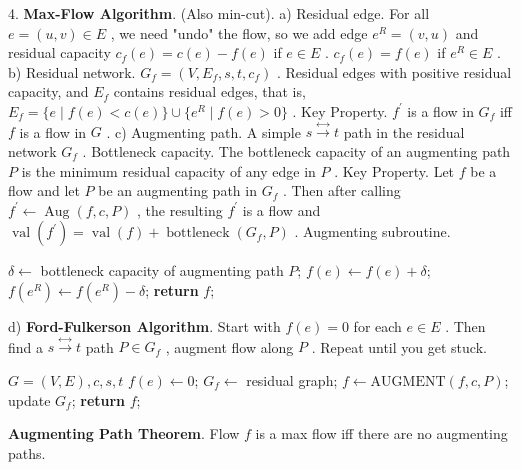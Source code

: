 \documentclass[10pt,a4paper]{article}
\begin{document}
4. \textbf{Max-Flow Algorithm}. (Also min-cut).
a) Residual edge. For all \(e = (u,v)\in E\) , we need "undo" the flow, so we add edge \(e^{R} = (v,u)\) and residual capacity \(c_{f}(e) = c(e) - f(e)\) if \(e\in E\) . \(c_{f}(e) = f(e)\) if \(e^{R}\in E\) .
b) Residual network. \(G_{f} = (V,E_{f},s,t,c_{f})\) . Residual edges with positive residual capacity, and \(E_{f}\) contains residual edges, that is, \(E_{f} = \{e\mid f(e)< c(e)\} \cup \{e^{R}\mid f(e) > 0\}\) .
Key Property. \(f^{\prime}\) is a flow in \(G_{f}\) iff \(f\) is a flow in \(G\) .
c) Augmenting path. A simple \(s\stackrel {\leftrightarrow}{\longrightarrow}t\) path in the residual network \(G_{f}\) .
Bottleneck capacity. The bottleneck capacity of an augmenting path \(P\) is the minimum residual capacity of any edge in \(P\) .
Key Property. Let \(f\) be a flow and let \(P\) be an augmenting path in \(G_{f}\) . Then after calling \(f^{\prime}\leftarrow \operatorname {Aug}(f,c,P)\) , the resulting \(f^{\prime}\) is a flow and \(\operatorname {val}(f^{\prime}) = \operatorname {val}(f) + \operatorname {bottleneck}(G_{f},P)\) .
Augmenting subroutine.
\begin{algorithm}
\caption{AUGMENT\((f, c, P)\)}
\begin{algorithmic}[1]
\State \(\delta \leftarrow\) bottleneck capacity of augmenting path \(P\);
        \State \(f(e) \leftarrow f(e) + \delta\); 
    \Else
        \State \(f(e^{R}) \leftarrow f(e^{R}) - \delta\); 
    \EndIf
\EndFor
\State \textbf{return} \(f\);
\end{algorithmic}
\end{algorithm}
d) \textbf{Ford-Fulkerson Algorithm}. Start with \(f(e) = 0\) for each \(e\in E\) . Then find a \(s\stackrel {\leftrightarrow}{\longrightarrow}t\) path \(P\in G_{f}\) , augment flow along \(P\) . Repeat until you get stuck.
\begin{algorithm}
\caption{Ford-Fulkerson Algorithm}
\begin{algorithmic}[1]
\Input \(G = (V,E), c, s, t\)
    \State \(f(e) \leftarrow 0\);
\EndFor
\State \(G_{f} \leftarrow\) residual graph;
    \State \(f \leftarrow \text{AUGMENT}(f, c, P)\);
    \State update \(G_{f}\);
\EndWhile
\State \textbf{return} \(f\);
\end{algorithmic}
\end{algorithm}
\textbf{Augmenting Path Theorem}. Flow \(f\) is a max flow iff there are no augmenting paths.
\end{document}

